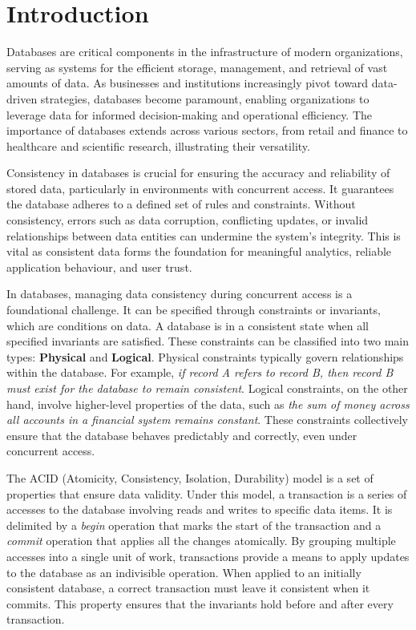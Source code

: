 %



\chapter{Introduction} \label{chap:intro}
\adjustmtc

Databases are critical components in the infrastructure of modern organizations, serving as systems for the efficient storage, management, and retrieval of vast amounts of data. As businesses and institutions increasingly pivot toward data-driven strategies, databases become paramount, enabling organizations to leverage data for informed decision-making and operational efficiency. The importance of databases extends across various sectors, from retail and finance to healthcare and scientific research, illustrating their versatility.


Consistency in databases is crucial for ensuring the accuracy and reliability of stored data, particularly in environments with concurrent access. It guarantees the database adheres to a defined set of rules and constraints. Without consistency, errors such as data corruption, conflicting updates, or invalid relationships between data entities can undermine the system's integrity. This is vital as consistent data forms the foundation for meaningful analytics, reliable application behaviour, and user trust.

In databases, managing data consistency during concurrent access is a foundational challenge. It can be specified through constraints or invariants, which are conditions on data. A database is in a consistent state when all specified invariants are satisfied. These constraints can be classified into two main types: \textbf{Physical} and \textbf{Logical}. Physical constraints typically govern relationships within the database. For example, \emph{if record A refers to record B, then record B must exist for the database to remain consistent}. Logical constraints, on the other hand, involve higher-level properties of the data, such as \emph{the sum of money across all accounts in a financial system remains constant}. These constraints collectively ensure that the database behaves predictably and correctly, even under concurrent access.

The ACID (Atomicity, Consistency, Isolation, Durability) model is a set of properties that ensure data validity. Under this model, a transaction is a series of accesses to the database involving reads and writes to specific data items. It is delimited by a \emph{begin} operation that marks the start of the transaction and a \emph{commit} operation that applies all the changes atomically. By grouping multiple accesses into a single unit of work, transactions provide a means to apply updates to the database as an indivisible operation. When applied to an initially consistent database, a correct transaction must leave it consistent when it commits. This property ensures that the invariants hold before and after every transaction.

